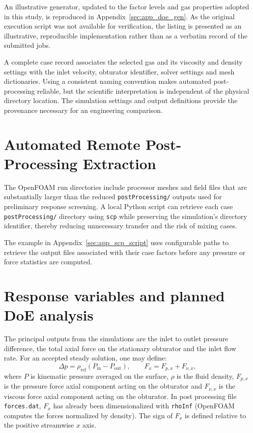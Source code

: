 An illustrative generator, updated to the factor levels and gas properties adopted in this study, is reproduced in Appendix~\ref{sec:app_doe_gen}. As the original execution script was not available for verification, the listing is presented as an illustrative, reproducible implementation rather than as a verbatim record of the submitted jobs.

A complete case record associates the selected gas and its viscosity and density settings with the inlet velocity, obturator identifier, solver settings and mesh dictionaries. Using a consistent naming convention makes automated post-processing reliable, but the scientific interpretation is independent of the physical directory location. The simulation settings and output definitions provide the provenance necessary for an engineering comparison.

\section{Automated Remote Post-Processing Extraction}
\label{sec:scp_extraction}

The OpenFOAM run directories include processor meshes and field files that are substantially larger than the reduced \texttt{postProcessing/} outputs used for preliminary response screening. A local Python script can retrieve each case \texttt{postProcessing/} directory using \texttt{scp} while preserving the simulation's directory identifier, thereby reducing unnecessary transfer and the risk of mixing cases.

The example in Appendix~\ref{sec:app_scp_script} uses configurable paths to retrieve the output files associated with their case factors before any pressure or force statistics are computed. 

\section{Response variables and planned DoE analysis}
\label{sec:doe_analysis}

The principal outputs from the simulations are the inlet to outlet pressure difference, the total axial force on the stationary obturator and the inlet flow rate. 
For an accepted steady solution, one may define:
\begin{equation}
    \Delta p=\rho_{\mathrm{ref}}\left(P_{\mathrm{in}}-P_{\mathrm{out}}\right),
    \qquad
    F_x=F_{p,x}+F_{\nu,x},
    \label{eq:doe_responses}
\end{equation}
where $P$ is kinematic pressure averaged on the surface, $\rho$ is the fluid density, $F_{p,x}$ is the pressure force axial component acting on the obturator and $F_{\nu,x}$ is the viscous force axial component acting on the obturator. In post processing file \texttt{forces.dat}, $F_x$ has already been dimensionalized with \texttt{rhoInf} (OpenFOAM computes the forces normalized by density). The sign of $F_x$ is defined relative to the positive streamwise $x$ axis.\\

